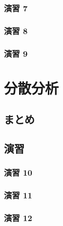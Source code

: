 \documentclass[
  12pt,
]{book}
\begin{document}
\hypertarget{ux6f14ux7fd2-7-1}{%
\subsubsection*{演習 7}\label{ux6f14ux7fd2-7-1}}

\hypertarget{ux6f14ux7fd2-8}{%
\subsubsection*{演習 8}\label{ux6f14ux7fd2-8}}

\hypertarget{ux6f14ux7fd2-9}{%
\subsubsection*{演習 9}\label{ux6f14ux7fd2-9}}

\hypertarget{ux5206ux6563ux5206ux6790}{%
\section{分散分析}\label{ux5206ux6563ux5206ux6790}}

\hypertarget{ux307eux3068ux3081-4}{%
\subsection{まとめ}\label{ux307eux3068ux3081-4}}

\hypertarget{ux6f14ux7fd2-10}{%
\subsection{演習}\label{ux6f14ux7fd2-10}}

\hypertarget{ux6f14ux7fd2-10-1}{%
\subsubsection*{演習 10}\label{ux6f14ux7fd2-10-1}}

\hypertarget{ux6f14ux7fd2-11}{%
\subsubsection*{演習 11}\label{ux6f14ux7fd2-11}}

\hypertarget{ux6f14ux7fd2-12}{%
\subsubsection*{演習 12}\label{ux6f14ux7fd2-12}}
\end{document}
